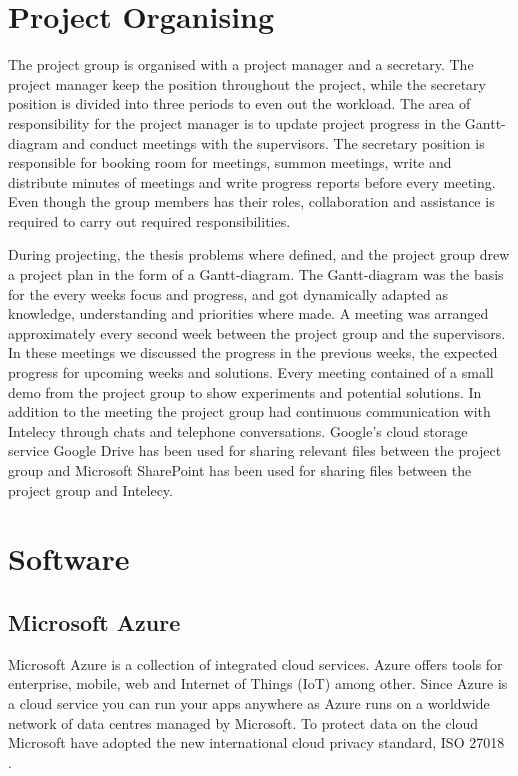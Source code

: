\documentclass[english, a4paper]{report}
\begin{document}
{    \section{Project Organising}\label{project organizing}
    {
        The project group is organised with a project manager and a secretary. The project manager keep the position throughout the project, while the secretary position is divided into three periods to even out the workload. The area of responsibility for the project manager is to update project progress in the Gantt-diagram and conduct meetings with the supervisors. The secretary position is responsible for booking room for meetings, summon meetings, write and distribute minutes of meetings and write progress reports before every meeting. Even though the group members has their roles, collaboration and assistance is required to carry out required responsibilities. 
        \par
        During projecting, the thesis problems where defined, and the project group drew a project plan in the form of a Gantt-diagram. The Gantt-diagram was the basis for the every weeks focus and progress, and got dynamically adapted as knowledge, understanding and priorities where made. A meeting was arranged approximately every second week between the project group and the supervisors. In these meetings we discussed the progress in the previous weeks, the expected progress for upcoming weeks and solutions. Every meeting contained of a small demo from the project group to show experiments and potential solutions. In addition to the meeting the project group had continuous communication with Intelecy through chats and telephone conversations. Google's cloud storage service Google Drive has been used for sharing relevant files between the project group and Microsoft SharePoint has been used for sharing files between the project group and Intelecy.  
    }
    
    \section{Software}
    {
        \subsection{Microsoft Azure}\label{microsoft azure}
        {
            Microsoft Azure is a collection of integrated cloud services. Azure offers tools for enterprise, mobile, web and Internet of Things (IoT) among other. Since Azure is a cloud service you can run your apps anywhere as Azure runs on a worldwide network of data centres managed by Microsoft. To protect data on the cloud Microsoft have adopted the new international cloud privacy standard, ISO 27018 \cite{azure}. 
            
}}}
\end{document}
